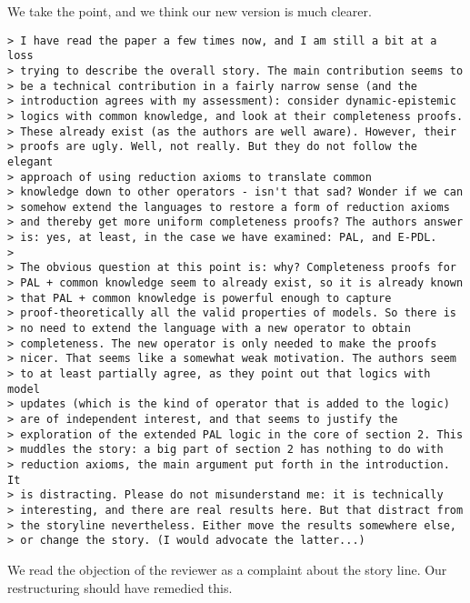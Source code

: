 \documentclass{article}
\begin{document}
We take the point, and we think our new version is much clearer.

\begin{verbatim}
> I have read the paper a few times now, and I am still a bit at a loss
> trying to describe the overall story. The main contribution seems to
> be a technical contribution in a fairly narrow sense (and the
> introduction agrees with my assessment): consider dynamic-epistemic
> logics with common knowledge, and look at their completeness proofs.
> These already exist (as the authors are well aware). However, their
> proofs are ugly. Well, not really. But they do not follow the elegant
> approach of using reduction axioms to translate common
> knowledge down to other operators - isn't that sad? Wonder if we can
> somehow extend the languages to restore a form of reduction axioms
> and thereby get more uniform completeness proofs? The authors answer
> is: yes, at least, in the case we have examined: PAL, and E-PDL.
>
> The obvious question at this point is: why? Completeness proofs for
> PAL + common knowledge seem to already exist, so it is already known
> that PAL + common knowledge is powerful enough to capture
> proof-theoretically all the valid properties of models. So there is
> no need to extend the language with a new operator to obtain
> completeness. The new operator is only needed to make the proofs
> nicer. That seems like a somewhat weak motivation. The authors seem
> to at least partially agree, as they point out that logics with model
> updates (which is the kind of operator that is added to the logic)
> are of independent interest, and that seems to justify the
> exploration of the extended PAL logic in the core of section 2. This
> muddles the story: a big part of section 2 has nothing to do with
> reduction axioms, the main argument put forth in the introduction. It
> is distracting. Please do not misunderstand me: it is technically
> interesting, and there are real results here. But that distract from
> the storyline nevertheless. Either move the results somewhere else,
> or change the story. (I would advocate the latter...)
\end{verbatim}

We read the objection of the reviewer as a complaint about the
story line. Our restructuring should have remedied this.
\end{document}
